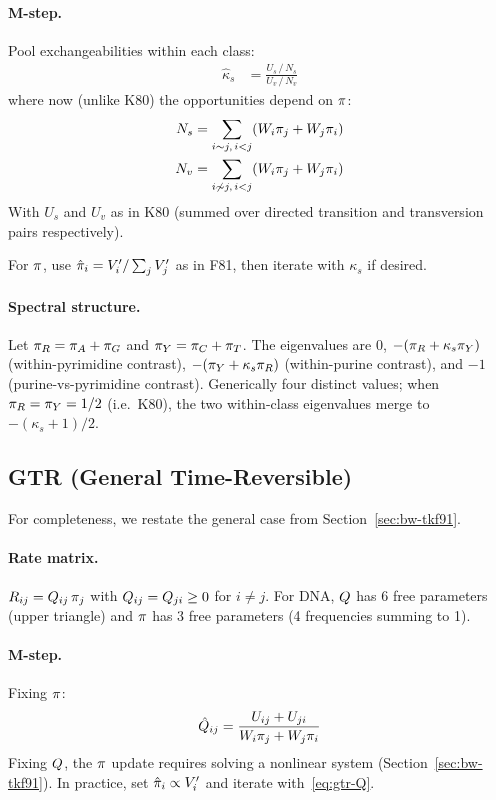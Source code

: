\paragraph{M-step.}
Pool exchangeabilities within each class:
\begin{align}
\hat{\kappa}_s &= \frac{U_s \,/\, N_s}{U_v \,/\, N_v}
\label{eq:hky85-kappa}
\end{align}
where now (unlike K80) the opportunities depend on $\pi$:
\begin{align}
N_s &= \sum_{i \sim j,\, i < j} (W_i \pi_j + W_j \pi_i) \label{eq:hky85-Ns} \\
N_v &= \sum_{i \not\sim j,\, i < j} (W_i \pi_j + W_j \pi_i) \label{eq:hky85-Nv}
\end{align}
With $U_s$ and $U_v$ as in K80 (summed over directed transition and
transversion pairs respectively).

For $\pi$, use $\hat{\pi}_i = V'_i / \sum_j V'_j$ as in F81,
then iterate with $\kappa_s$ if desired.

\paragraph{Spectral structure.}
Let $\pi_R = \pi_A + \pi_G$ and $\pi_Y = \pi_C + \pi_T$.
The eigenvalues are
$0$,
$-(\pi_R + \kappa_s \pi_Y)$ (within-pyrimidine contrast),
$-(\pi_Y + \kappa_s \pi_R)$ (within-purine contrast),
and $-1$ (purine-vs-pyrimidine contrast).
Generically four distinct values;
when $\pi_R = \pi_Y = 1/2$ (i.e.\ K80),
the two within-class eigenvalues merge to $-(\kappa_s + 1)/2$.


\subsection{GTR (General Time-Reversible)}
\label{sec:mstep-gtr}

For completeness, we restate the general case from
Section~\ref{sec:bw-tkf91}.

\paragraph{Rate matrix.}
$R_{ij} = Q_{ij}\,\pi_j$ with $Q_{ij} = Q_{ji} \geq 0$
for $i \neq j$.
For DNA, $Q$ has 6 free parameters (upper triangle)
and $\pi$ has 3 free parameters (4 frequencies summing to 1).

\paragraph{M-step.}
Fixing $\pi$:
\begin{equation}
\label{eq:gtr-Q}
\hat{Q}_{ij} = \frac{U_{ij} + U_{ji}}{W_i \pi_j + W_j \pi_i}
\end{equation}
Fixing $Q$, the $\pi$ update requires solving a nonlinear system
(Section~\ref{sec:bw-tkf91}).
In practice, set $\hat{\pi}_i \propto V'_i$
and iterate with~\eqref{eq:gtr-Q}.

